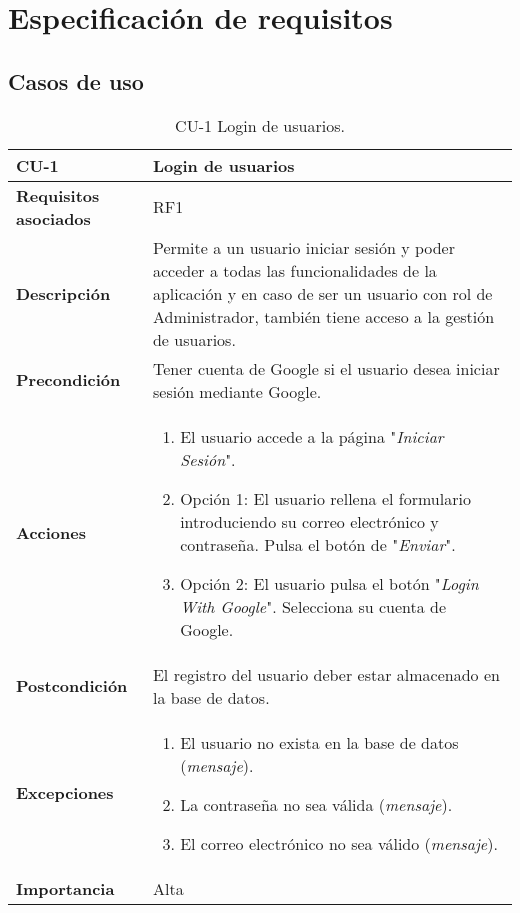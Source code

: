 \begin{table}[p]
\section{Especificación de requisitos}

\hfill

\subsection{Casos de uso}

\hfill

	\centering
	\begin{tabularx}{\linewidth}{ p{} p{}}
		\toprule
		\textbf{CU-1}    & \textbf{Login de usuarios}\\
		\toprule
		\textbf{Requisitos asociados} & RF1 \\
		\textbf{Descripción}          & Permite a un usuario iniciar sesión y poder acceder a todas las funcionalidades de la aplicación y en caso de ser un usuario con rol de Administrador, también tiene acceso a la gestión de usuarios. \\
		\textbf{Precondición}         & Tener cuenta de Google si el usuario desea iniciar sesión mediante Google.\\
		\textbf{Acciones}             &
		\begin{enumerate}
			\def\labelenumi{\arabic{enumi}.}
			\tightlist
			\item El usuario accede a la página "\textit{Iniciar Sesión}".
			\item Opción 1: El usuario rellena el formulario introduciendo su correo electrónico y contraseña.
			Pulsa el botón de "\textit{Enviar}".
			\item Opción 2: El usuario pulsa el botón "\textit{Login With Google}".
			Selecciona su cuenta de Google.
		\end{enumerate}\\
		\textbf{Postcondición}        & El registro del usuario deber estar almacenado en la base de datos.		\\
		\textbf{Excepciones}          & 
		\begin{enumerate}
			\def\labelenumi{\arabic{enumi}.}
			\tightlist
			\item El usuario no exista en la base de datos (\textit{mensaje}).
			\item La contraseña no sea válida (\textit{mensaje}).
			\item El correo electrónico no sea válido (\textit{mensaje}).		
            \end{enumerate}\\
		\textbf{Importancia}          & Alta \\
		\bottomrule
	\end{tabularx}
	\caption{CU-1 Login de usuarios.}
\end{table}

